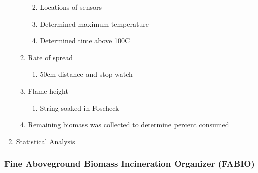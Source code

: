 \documentclass[11pt,a4paper]{article}
\providecommand{\tightlist}{%
  \setlength{\itemsep}{0pt}\setlength{\parskip}{0pt}}
\begin{document}
\begin{enumerate}
\begin{enumerate}
    \begin{enumerate}
    \def\labelenumiii{\roman{enumiii}.}
    \tightlist
    \item
      Locations of sensors
    \item
      Determined maximum temperature
    \item
      Determined time above 100C
    \end{enumerate}
  \item
    Rate of spread

    \begin{enumerate}
    \def\labelenumiii{\roman{enumiii}.}
    \tightlist
    \item
      50cm distance and stop watch
    \end{enumerate}
  \item
    Flame height

    \begin{enumerate}
    \def\labelenumiii{\roman{enumiii}.}
    \tightlist
    \item
      String soaked in Foscheck
    \end{enumerate}
  \item
    Remaining biomass was collected to determine percent consumed
  \end{enumerate}
\item
  Statistical Analysis
\end{enumerate}

\hypertarget{fine-aboveground-biomass-incineration-organizer-fabio}{%
\subsubsection{Fine Aboveground Biomass Incineration Organizer
(FABIO)}\label{fine-aboveground-biomass-incineration-organizer-fabio}}
\end{document}
